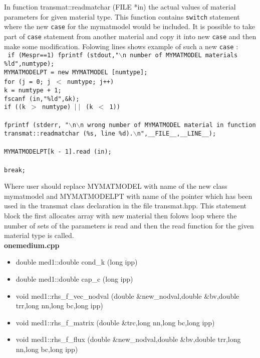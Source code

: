 In function {\sf transmat::readmatchar (FILE *in)} the actual values of material parameters for given material type. This function
contains {\tt switch} statement where the new {\tt case} for the  {\sf mymatmodel} would be included.
It is possible to take part of {\tt case} statement from another material and copy it into new {\tt case} and then
make some modification. Folowing lines shows example of such a new {\tt case} :\\
{\tt
      if (Mespr==1)  fprintf (stdout,"$\backslash$n number of MYMATMODEL materials \%ld",numtype);\\
      MYMATMODELPT = new MYMATMODEL [numtype];\\
      for (j = 0; j $<$ numtype; j++){\\
        k = numtype + 1;\\
        fscanf (in,"\%ld",\&k);\\
        if ((k $>$ numtype) $\mid\mid$ (k $<$ 1))\\
        {\\
          fprintf (stderr, "$\backslash$n$\backslash$n wrong number of MYMATMODEL material in function\\
                   transmat::readmatchar (\%s, line \%d).$\backslash$n",\_\_FILE\_\_,\_\_LINE\_\_);\\
        }\\
        MYMATMODELPT[k - 1].read (in);\\
      }\\
      break;\\
}

Where user should replace MYMATMODEL with name of the new class {\sf mymatmodel} and MYMATMODELPT with
name of the pointer which has been used in the {\sf transmat} class declaration in the file transmat.hpp. This
statement block the first allocates array with new material then folows loop where the number of sets of the
parameters is read and then the {\sf read} function for the given material type is called.\\

{\bf onemedium.cpp}
\begin{itemize}
\item {\sf double med1::double cond\_k (long ipp)}
\item {\sf double med1::double cap\_c (long ipp)}
\item {\sf void med1::rhs\_f\_vec\_nodval (double \&new\_nodval,double \&bv,double trr,long nn,long bc,long ipp)}
\item {\sf void med1::rhs\_f\_matrix (double \&trc,long nn,long bc,long ipp)}
\item {\sf void med1::rhs\_f\_flux (double \&new\_nodval,double \&bv,double trr,long nn,long bc,long ipp)}

\end{itemize}


